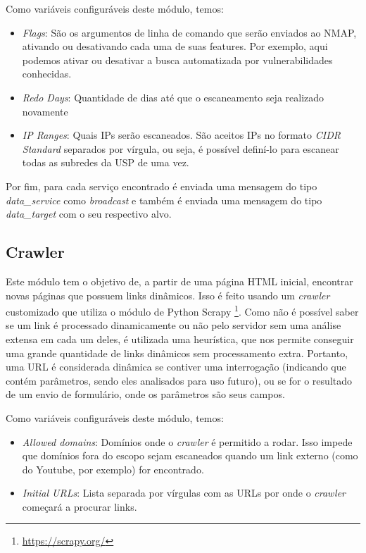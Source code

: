     Como variáveis configuráveis deste módulo, temos:
    \begin{itemize}
        \item \emph{Flags}: São os argumentos de linha de comando que serão enviados ao NMAP, ativando ou desativando cada uma de suas features. Por exemplo, aqui podemos ativar ou desativar a busca automatizada por vulnerabilidades conhecidas.
        \item \emph{Redo Days}: Quantidade de dias até que o escaneamento seja realizado novamente
        \item \emph{IP Ranges}: Quais IPs serão escaneados. São aceitos IPs no formato \textit{CIDR Standard} separados por vírgula, ou seja, é possível definí-lo para escanear todas as subredes da USP de uma vez.
    \end{itemize}
    
    Por fim, para cada serviço encontrado é enviada uma mensagem do tipo \textit{data\_service} como \textit{broadcast} e também é enviada uma mensagem do tipo \textit{data\_target} com o seu respectivo alvo.
    
    \subsection{Crawler}
    Este módulo tem o objetivo de, a partir de uma página HTML inicial, encontrar novas páginas que possuem links dinâmicos. Isso é feito usando um \textit{crawler} customizado que utiliza o módulo de Python Scrapy \footnote{\url{https://scrapy.org/}}. Como não é possível saber se um link é processado dinamicamente ou não pelo servidor sem uma análise extensa em cada um deles, é utilizada uma heurística, que nos permite conseguir uma grande quantidade de links dinâmicos sem processamento extra. Portanto, uma URL é considerada dinâmica se contiver uma interrogação (indicando que contém parâmetros, sendo eles analisados para uso futuro), ou se for o resultado de um envio de formulário, onde os parâmetros são seus campos. 
    
    Como variáveis configuráveis deste módulo, temos:
    \begin{itemize}
        \item \emph{Allowed domains}: Domínios onde o \textit{crawler} é permitido a rodar. Isso impede que domínios fora do escopo sejam escaneados quando um link externo (como do Youtube, por exemplo) for encontrado.
        \item \emph{Initial URLs}: Lista separada por vírgulas com as URLs por onde o \textit{crawler} começará a procurar links. 
    \end{itemize}
    
